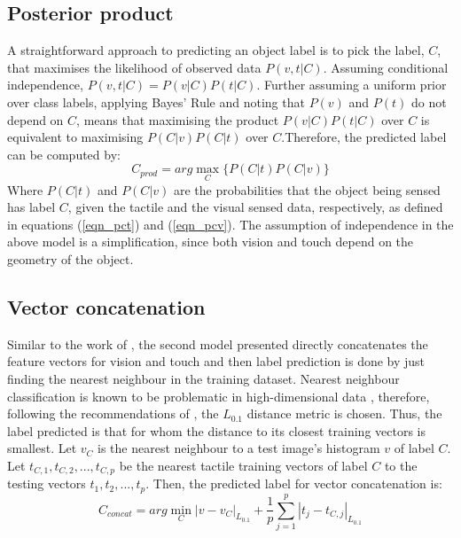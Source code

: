 \documentclass[9pt,technote]{IEEEtran}  %
\begin{document}
\subsection{Posterior product}
A straightforward approach to predicting an object label is to pick the label, $C$, that maximises the likelihood of observed data $P(v,t|C)$. Assuming conditional independence, $P(v,t|C) = P(v|C)P(t|C)$. Further assuming a uniform prior over class labels, applying Bayes' Rule and noting that $P(v)$ and $P(t)$ do not depend on $C$, means that maximising the product $P(v|C)P(t|C)$ over $C$ is equivalent to maximising $P(C|v)P(C|t)$ over $C$.Therefore, the predicted label can be computed by: 
\begin{equation}
C_{prod} = arg\max_C\{P(C|t)P(C|v)\}
\label{eqn_cprod}
\end{equation}
Where $P(C|t)$ and $P(C|v)$ are the probabilities that the object being sensed has label $C$, given the tactile and the visual sensed data, respectively, as defined in equations (\ref{eqn_pct}) and (\ref{eqn_pcv}).
The assumption of independence in the above model is a simplification, since both vision and touch depend on the geometry of the object. 
\subsection{Vector concatenation}
Similar to the work of \cite{Yang2015}, the second model presented directly concatenates the feature vectors for vision and touch and then label prediction is done by just finding the nearest neighbour in the training dataset. Nearest neighbour classification is known to be problematic in high-dimensional data \cite{Aggarwal2001}, therefore, following the recommendations of \cite{Aggarwal2001}, the $L_{0.1}$ distance metric is chosen. Thus, the label predicted is that for whom the distance to its closest training vectors is smallest. Let $v_C$ is the nearest neighbour to a test image's histogram $v$ of label $C$. Let $t_{C,1}, t_{C,2}, ..., t_{C,p}$ be the nearest tactile training vectors of label $C$ to the testing vectors $t_1, t_2, ..., t_p$. Then, the predicted label for vector concatenation is:
\begin{equation}
C_{concat} = arg\min_C |v - v_C|_{L_{0.1}} + \frac{1}{p}\sum_{j=1}^{p}|t_j - t_{C,j}|_{L_{0.1}}
\label{eqn_cconcat}
\end{equation}
\end{document}
